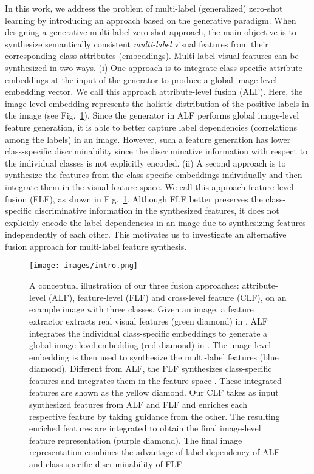 \documentclass[final]{cvpr}
\begin{document}
In this work, we address the problem of multi-label (generalized) zero-shot learning by introducing an approach based on the generative paradigm. 
When designing a generative multi-label zero-shot approach, the main objective is to synthesize semantically consistent \textit{multi-label} visual features from their corresponding class attributes (embeddings). Multi-label visual features can be synthesized in two ways. (i) One approach is to integrate class-specific attribute embeddings at the input of the generator to produce a global image-level embedding vector. We call this approach attribute-level fusion (ALF). Here, the image-level embedding represents the holistic distribution of the positive labels in the image (see Fig.~\ref{fig:intro}). Since the generator in ALF performs global image-level feature generation, it is able to better capture label dependencies (correlations among the labels) in an image. However, such a feature generation has lower class-specific discriminability since the discriminative information with respect to the individual classes is not explicitly encoded.  (ii) A second approach is to synthesize the features from the class-specific embeddings individually and then integrate them in the visual feature space. We call this approach feature-level fusion (FLF), as shown in Fig.~\ref{fig:intro}. Although FLF better preserves the class-specific discriminative information in the synthesized features, it does not explicitly encode the label dependencies in an image due to synthesizing features independently of each other. This motivates us to investigate an alternative fusion approach for
multi-label feature synthesis.


\begin{figure}[t]
\centering
\texttt{[image: images/intro.png]}
\caption{A conceptual illustration of our three fusion approaches: attribute-level (ALF), feature-level (FLF) and cross-level feature (CLF), on an example image with three classes. Given an image, a feature extractor   
extracts real visual features (green diamond) in .
ALF integrates the individual class-specific embeddings to generate a global image-level embedding (red diamond) in  . The image-level embedding is then used to synthesize the multi-label features (blue diamond). Different from ALF, the FLF synthesizes class-specific features and integrates them in the feature space . These integrated features are shown as the yellow diamond. Our CLF takes as input synthesized features from ALF and FLF and enriches each respective feature by taking guidance from the other. The resulting enriched features are integrated to obtain the final image-level feature representation (purple diamond). The final image representation combines the advantage of label dependency of ALF and class-specific discriminability of FLF. \vspace{-0.3cm}
}
\label{fig:intro}
\end{figure}
\end{document}
